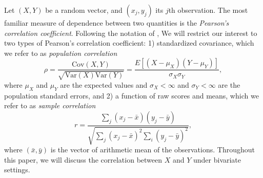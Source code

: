 \documentclass[12pt, a4paper]{article}
\newcommand{\cov}{\text{Cov}}
\newcommand{\var}{\text{Var}}
\newcommand{\samplecor}{sample correlation}
\newcommand{\popucor}{population correlation}
\begin{document}
	Let $(X, Y)$ be a random vector, and $(x_j, y_j)$ its $j$th observation. The most familiar measure of dependence between two quantities is the \textit{Pearson's correlation coefficient}.  Following the notation of \cite{lee1988thirteen}, We will restrict our interest to two types of Pearson's correlation coefficient: 1) standardized covariance, which we refer to as \textit{\popucor}
	\begin{equation}\label{eq:popucor}
		\rho =\dfrac{\cov(X, Y)}{\sqrt{\var(X)\var(Y)}} = \dfrac{E[(X-\mu_X)(Y-\mu_Y)]}{\sigma_X\sigma_Y}, 
	\end{equation} 	where $\mu_X$ and $\mu_Y$ are the expected values and $\sigma_X<\infty$ and $\sigma_Y<\infty$ are the population standard errors, and 2) a function of raw scores and means, which we refer to as \textit{\samplecor}
	\begin{equation}\label{eq:samplecor}
	r  =  \dfrac{\sum_j (x_j -\bar{x})(y_j - \bar{y})}{\sqrt{\sum_{j}(x_j - \bar{x})^2\sum_i(y_j - \bar{y})^2}}, 
	\end{equation}
	where $(\bar{x}, \bar{y})$ is the vector of arithmetic mean of the observations.
	Throughout this paper, we will discuss the correlation between $X$ and $Y$ under bivariate settings. 
\end{document}
